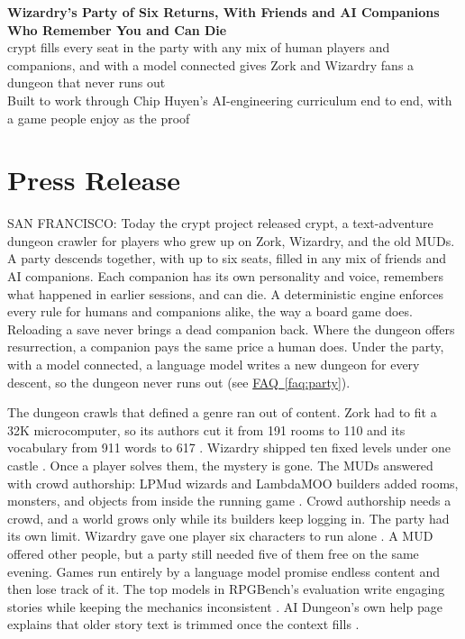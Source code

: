 \documentclass[11pt,letterpaper]{article}
\newcommand{\prsection}[1]{%
  \vspace{1em}{\large\bfseries\color{SectionBlue}#1}\vspace{0.3em}\par}
\newcommand{\faqref}[1]{\hyperref[#1]{FAQ~\ref*{#1}}}
\begin{document}
\begin{center}
  {\LARGE\bfseries\color{SectionBlue} Wizardry's Party of Six Returns, With Friends and AI Companions Who Remember You and Can Die} \\[0.8em]
  {\large\color{AccentGray} crypt fills every seat in the party with any mix of human players and companions, and with a model connected gives Zork and Wizardry fans a dungeon that never runs out} \\[0.3em]
  {\large\color{AccentGray} Built to work through Chip Huyen's AI-engineering curriculum end to end, with a game people enjoy as the proof}
\end{center}

\vspace{0.5em}

\section*{Press Release}

SAN FRANCISCO: Today the crypt project released crypt, a text-adventure
dungeon crawler for players who grew up on Zork, Wizardry, and the old
MUDs. A party descends together, with up to six seats, filled in any mix
of friends and AI companions. Each companion has its own personality
and voice, remembers what happened in earlier sessions, and can die. A
deterministic engine enforces every rule for humans and companions
alike, the way a board game does. Reloading a save never brings a dead
companion back. Where the dungeon offers resurrection, a companion pays
the same price a human does. Under the party, with a model connected, a
language model writes a new dungeon for every descent, so the dungeon never
runs out (see \faqref{faq:party}).

\prsection{Problem}

The dungeon crawls that defined a genre ran out of content. Zork had to fit
a 32K microcomputer, so its authors cut it from 191 rooms to 110 and its
vocabulary from 911 words to 617 \cite{maher2012zilzmachine}. Wizardry
shipped ten fixed levels under one castle \cite{wikipedia2026wizardry1}.
Once a player solves them, the mystery is gone. The MUDs answered with crowd
authorship: LPMud wizards and LambdaMOO builders added rooms, monsters, and
objects from inside the running game
\cite{wikipedia2026lpmud,wikipedia2026lambdamoo}. Crowd authorship needs a
crowd, and a world grows only while its builders keep logging in. The party
had its own limit. Wizardry gave one player six characters to run alone
\cite{wikipedia2026wizardry1}. A MUD offered other people, but a party
still needed five of them free on the same evening. Games run entirely by a
language model promise endless content and then lose track of it. The top
models in RPGBench's evaluation write engaging stories while keeping the mechanics inconsistent
\cite{yu2025rpgbench}. AI Dungeon's own help page explains that older story
text is trimmed once the context fills \cite{latitude2025help}.
\end{document}
